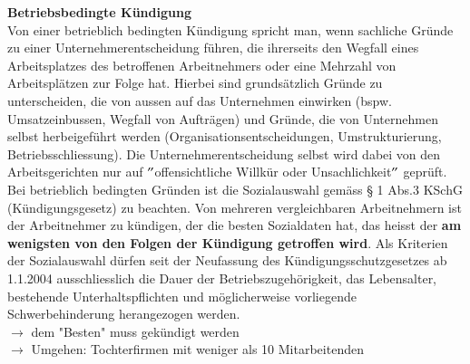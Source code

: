 \vspace{\baselineskip}
\textbf{Betriebsbedingte Kündigung}\\
Von einer betrieblich bedingten Kündigung spricht man, wenn sachliche Gründe zu einer Unternehmerentscheidung führen, die ihrerseits den Wegfall eines Arbeitsplatzes des betroffenen Arbeitnehmers oder eine Mehrzahl von Arbeitsplätzen zur Folge hat. Hierbei sind grundsätzlich Gründe zu unterscheiden, die von aussen auf das Unternehmen einwirken (bspw. Umsatzeinbussen, Wegfall von Aufträgen) und Gründe, die von Unternehmen selbst herbeigeführt werden (Organisationsentscheidungen, Umstrukturierung, Betriebsschliessung). Die Unternehmerentscheidung selbst wird dabei von den Arbeitsgerichten nur auf $"$offensichtliche Willkür oder Unsachlichkeit$"$ geprüft.\\
Bei betrieblich bedingten Gründen ist die Sozialauswahl gemäss § 1 Abs.3 KSchG (Kündigungsgesetz) zu beachten. Von mehreren vergleichbaren Arbeitnehmern ist der Arbeitnehmer zu kündigen, der die besten Sozialdaten hat, das heisst der \textbf{am wenigsten von den Folgen der Kündigung getroffen wird}. Als Kriterien der Sozialauswahl dürfen seit der Neufassung des Kündigungsschutzgesetzes ab 1.1.2004 ausschliesslich die Dauer der Betriebszugehörigkeit, das Lebensalter, bestehende Unterhaltspflichten und möglicherweise vorliegende Schwerbehinderung herangezogen werden.\\
$\rightarrow$ dem "Besten" muss gekündigt werden\\
$\rightarrow$ Umgehen: Tochterfirmen mit weniger als 10 Mitarbeitenden

\clearpage
\pagebreak


